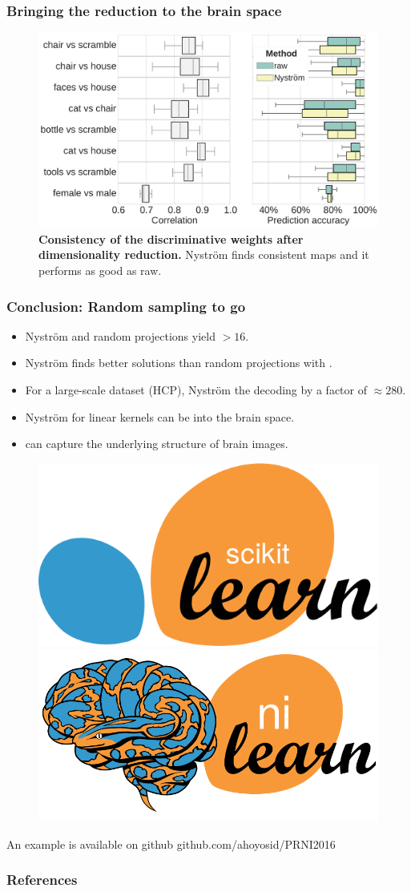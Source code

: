 \documentclass{beamer}
\begin{document}
\begin{frame}\frametitle{\textbf{Bringing the reduction to the brain space}}
\begin{figure}
\centering
\includegraphics[width=1\linewidth]{figures/correlation.pdf}
\caption{\textbf{Consistency of the discriminative weights after dimensionality 
reduction.} Nystr\"om finds consistent maps and it performs as good as raw.}
\end{figure}
\end{frame}


\begin{frame}\frametitle{\textbf{Conclusion:} Random sampling to go}
\begin{block}{}
\begin{itemize}
\item Nystr\"om and random projections yield  $> 16$.
\item Nystr\"om finds better solutions than random projections with 
.
\item For a large-scale dataset (HCP), Nystr\"om  
the 
decoding by a factor of $\approx 280$.
\item Nystr\"om for linear kernels can be  
into the brain space.
\item {} can capture the underlying 
structure of brain images.
\end{itemize}
\end{block}

\begin{figure}
\includegraphics[width=0.3\linewidth]{figures/scikit-learn-logo.png}\hfill
\includegraphics[width=0.3\linewidth]{figures/nilearn-logo.png}
\end{figure}

An example is available on github \alert{github.com/ahoyosid/PRNI2016} 

\end{frame}

\begin{frame}\frametitle{References}


\end{frame}
\end{document}

